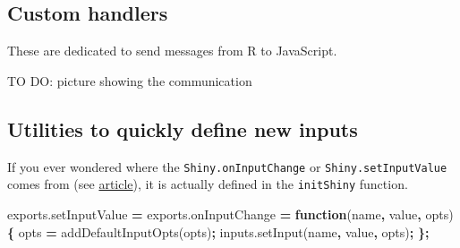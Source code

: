 \documentclass[]{book}
\newenvironment{Shaded}{\begin{snugshade}}{\end{snugshade}}
\newcommand{\AttributeTok}[1]{\textcolor[rgb]{0.77,0.63,0.00}{#1}}
\newcommand{\ControlFlowTok}[1]{\textcolor[rgb]{0.13,0.29,0.53}{\textbf{#1}}}
\newcommand{\DataTypeTok}[1]{\textcolor[rgb]{0.13,0.29,0.53}{#1}}
\newcommand{\KeywordTok}[1]{\textcolor[rgb]{0.13,0.29,0.53}{\textbf{#1}}}
\newcommand{\NormalTok}[1]{#1}
\newcommand{\OperatorTok}[1]{\textcolor[rgb]{0.81,0.36,0.00}{\textbf{#1}}}
\newcommand{\OtherTok}[1]{\textcolor[rgb]{0.56,0.35,0.01}{#1}}
\newcommand{\StringTok}[1]{\textcolor[rgb]{0.31,0.60,0.02}{#1}}
\newcommand{\VariableTok}[1]{\textcolor[rgb]{0.00,0.00,0.00}{#1}}
\begin{document}
\begin{Shaded}
\end{Shaded}

\hypertarget{custom-handlers}{%
\subsection{Custom handlers}\label{custom-handlers}}

These are dedicated to send messages from R to JavaScript.

TO DO: picture showing the communication

\hypertarget{utilities-to-quickly-define-new-inputs}{%
\subsection{Utilities to quickly define new inputs}\label{utilities-to-quickly-define-new-inputs}}

If you ever wondered where the \texttt{Shiny.onInputChange} or \texttt{Shiny.setInputValue} comes from (see \href{https://shiny.rstudio.com/articles/communicating-with-js.html}{article}), it is actually defined in the \texttt{initShiny} function.

\begin{Shaded}
\begin{Highlighting}[]
\VariableTok{exports}\NormalTok{.}\AttributeTok{setInputValue} \OperatorTok{=} \VariableTok{exports}\NormalTok{.}\AttributeTok{onInputChange} \OperatorTok{=} \KeywordTok{function}\NormalTok{(name}\OperatorTok{,}\NormalTok{ value}\OperatorTok{,}\NormalTok{ opts) }\OperatorTok{\{}
\NormalTok{  opts }\OperatorTok{=} \AttributeTok{addDefaultInputOpts}\NormalTok{(opts)}\OperatorTok{;}
  \VariableTok{inputs}\NormalTok{.}\AttributeTok{setInput}\NormalTok{(name}\OperatorTok{,}\NormalTok{ value}\OperatorTok{,}\NormalTok{ opts)}\OperatorTok{;}
\OperatorTok{\};}
\end{Highlighting}
\end{Shaded}
\end{document}
